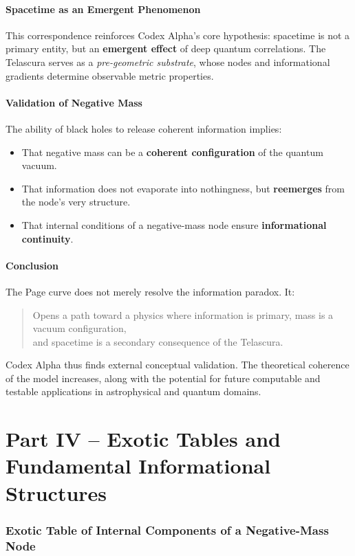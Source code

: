 \documentclass[12pt]{article}
\begin{document}
\subsection*{Spacetime as an Emergent Phenomenon}
This correspondence reinforces Codex Alpha's core hypothesis: spacetime is not a primary entity, but an \textbf{emergent effect} of deep quantum correlations. The Telascura serves as a \textit{pre-geometric substrate}, whose nodes and informational gradients determine observable metric properties.

\subsection*{Validation of Negative Mass}
The ability of black holes to release coherent information implies:
\begin{itemize}
    \item That negative mass can be a \textbf{coherent configuration} of the quantum vacuum.
    \item That information does not evaporate into nothingness, but \textbf{reemerges} from the node’s very structure.
    \item That internal conditions of a negative-mass node ensure \textbf{informational continuity}.
\end{itemize}

\subsection*{Conclusion}
The Page curve does not merely resolve the information paradox. It:
\begin{quote}
Opens a path toward a physics where information is primary, mass is a vacuum configuration,\\
and spacetime is a secondary consequence of the Telascura.
\end{quote}

Codex Alpha thus finds external conceptual validation. The theoretical coherence of the model increases, along with the potential for future computable and testable applications in astrophysical and quantum domains.
\part{Part IV – Exotic Tables and Fundamental Informational Structures}

\section{Exotic Table of Internal Components of a Negative-Mass Node}
\end{document}
